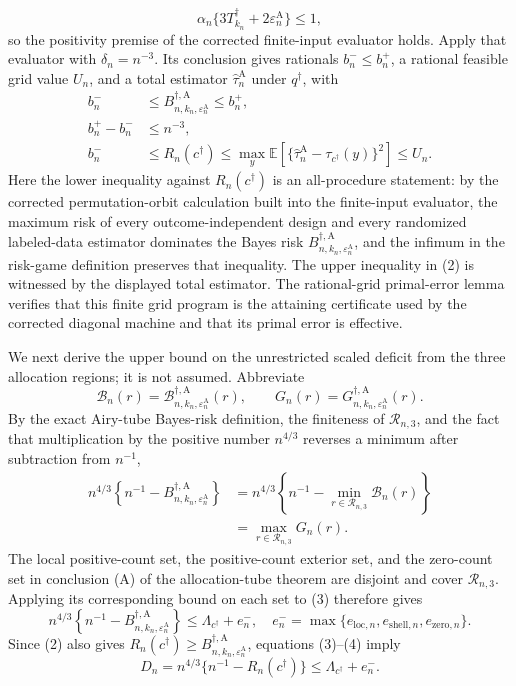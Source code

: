 \[
\alpha_n\{3T_{k_n}^\dagger+2\varepsilon_n^{\mathrm A}\}\le1, \tag{1}
\]
so the positivity premise of the corrected finite-input evaluator holds.  Apply that evaluator with \(\delta_n=n^{-3}\).  Its conclusion gives rationals \(b_n^-\le b_n^+\), a rational feasible grid value \(U_n\), and a total estimator \(\widehat\tau_n^{\mathrm A}\) under \(q^\dagger\), with
\[
\begin{aligned}
b_n^-&\le B_{n,k_n,\varepsilon_n^{\mathrm A}}^{\dagger,\mathrm A}
\le b_n^+,\\
b_n^+-b_n^-&\le n^{-3},\\
b_n^-&\le R_n(c^\dagger)\le
\max_y\mathbb E\!\left[
\{\widehat\tau_n^{\mathrm A}-\tau_{c^\dagger}(y)\}^2
\right]\le U_n.
\end{aligned} \tag{2}
\]
Here the lower inequality against \(R_n(c^\dagger)\) is an all-procedure statement: by the corrected permutation-orbit calculation built into the finite-input evaluator, the maximum risk of every outcome-independent design and every randomized labeled-data estimator dominates the Bayes risk \(B_{n,k_n,\varepsilon_n^{\mathrm A}}^{\dagger,\mathrm A}\), and the infimum in the risk-game definition preserves that inequality.  The upper inequality in (2) is witnessed by the displayed total estimator.  The rational-grid primal-error lemma verifies that this finite grid program is the attaining certificate used by the corrected diagonal machine and that its primal error is effective.

We next derive the upper bound on the unrestricted scaled deficit from the three allocation regions; it is not assumed.  Abbreviate
\[
\mathcal B_n(r)=
\mathcal B_{n,k_n,\varepsilon_n^{\mathrm A}}^{\dagger,\mathrm A}(r),
\qquad
G_n(r)=G_{n,k_n,\varepsilon_n^{\mathrm A}}^{\dagger,\mathrm A}(r).
\]
By the exact Airy-tube Bayes-risk definition, the finiteness of \(\mathcal R_{n,3}\), and the fact that multiplication by the positive number \(n^{4/3}\) reverses a minimum after subtraction from \(n^{-1}\),
\[
\begin{aligned}
n^{4/3}\left\{n^{-1}-
B_{n,k_n,\varepsilon_n^{\mathrm A}}^{\dagger,\mathrm A}\right\}
&=n^{4/3}\left\{n^{-1}-\min_{r\in\mathcal R_{n,3}}\mathcal B_n(r)\right\}\\
&=\max_{r\in\mathcal R_{n,3}}G_n(r). 
\end{aligned} \tag{3}
\]
The local positive-count set, the positive-count exterior set, and the zero-count set in conclusion (A) of the allocation-tube theorem are disjoint and cover \(\mathcal R_{n,3}\).  Applying its corresponding bound on each set to (3) therefore gives
\[
n^{4/3}\left\{n^{-1}-
B_{n,k_n,\varepsilon_n^{\mathrm A}}^{\dagger,\mathrm A}\right\}
\le \Lambda_{c^\dagger}+e_n^-,
\quad
e_n^-=\max\{e_{\mathrm{loc},n},e_{\mathrm{shell},n},e_{\mathrm{zero},n}\}.
\tag{4}
\]
Since (2) also gives
\(R_n(c^\dagger)\ge
B_{n,k_n,\varepsilon_n^{\mathrm A}}^{\dagger,\mathrm A}\), equations (3)--(4) imply
\[
D_n=n^{4/3}\{n^{-1}-R_n(c^\dagger)\}
\le\Lambda_{c^\dagger}+e_n^-.
\tag{5}
\]

